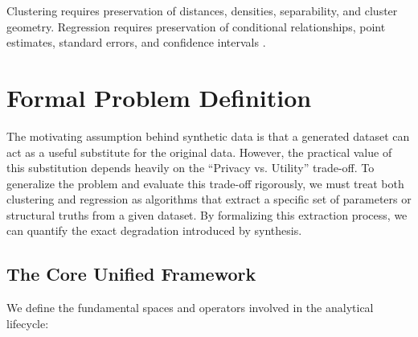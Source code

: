 Clustering requires preservation of distances, densities, separability, and cluster geometry. Regression requires preservation of conditional relationships, point estimates, standard errors, and confidence intervals \cite{reiter2003, drechsler2011}.

\section{Formal Problem Definition}
\label{sec:general-problem}

The motivating assumption behind synthetic data is that a generated dataset can act as a useful substitute for the original data. However, the practical value of this substitution depends heavily on the ``Privacy vs. Utility'' trade-off. To generalize the problem and evaluate this trade-off rigorously, we must treat both clustering and regression as algorithms that extract a specific set of parameters or structural truths from a given dataset. By formalizing this extraction process, we can quantify the exact degradation introduced by synthesis.

\subsection{The Core Unified Framework}
We define the fundamental spaces and operators involved in the analytical lifecycle:

